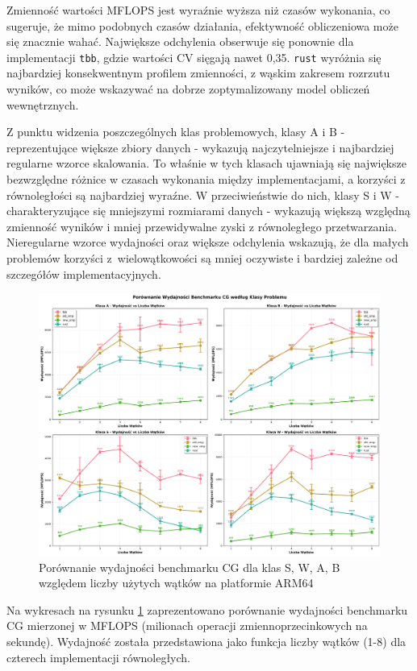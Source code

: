Zmienność wartości MFLOPS jest wyraźnie wyższa niż czasów wykonania, co sugeruje, że mimo podobnych czasów działania, efektywność obliczeniowa może się znacznie wahać. Największe odchylenia obserwuje się ponownie dla implementacji \texttt{tbb}, gdzie wartości CV sięgają nawet 0,35. \texttt{rust} wyróżnia się najbardziej konsekwentnym profilem zmienności, z wąskim zakresem rozrzutu wyników, co może wskazywać na dobrze zoptymalizowany model obliczeń wewnętrznych.

Z punktu widzenia poszczególnych klas problemowych, klasy A i B - reprezentujące większe zbiory danych - wykazują najczytelniejsze i najbardziej regularne wzorce skalowania. To właśnie w tych klasach ujawniają się największe bezwzględne różnice w czasach wykonania między implementacjami, a korzyści z równoległości są najbardziej wyraźne. W przeciwieństwie do nich, klasy S i W - charakteryzujące się mniejszymi rozmiarami danych - wykazują większą względną zmienność wyników i mniej przewidywalne zyski z równoległego przetwarzania. Nieregularne wzorce wydajności oraz większe odchylenia wskazują, że dla małych problemów korzyści z~wielowątkowości są mniej oczywiste i bardziej zależne od szczegółów implementacyjnych.

\begin{figure}[H]
    \centering
    \includegraphics[width=\textwidth]{analiza/images/parallel/cg/arm/cg_porownanie_wydajnosci.png}
    \caption{Porównanie wydajności benchmarku CG dla klas S, W, A, B względem liczby użytych wątków na platformie ARM64}
    \label{cg_porownanie_wydajnosci}
\end{figure}
Na wykresach na rysunku \ref{cg_porownanie_wydajnosci} zaprezentowano porównanie wydajności benchmarku CG mierzonej w MFLOPS (milionach operacji zmiennoprzecinkowych na sekundę). Wydajność została przedstawiona jako funkcja liczby wątków (1-8) dla czterech implementacji równoległych.

